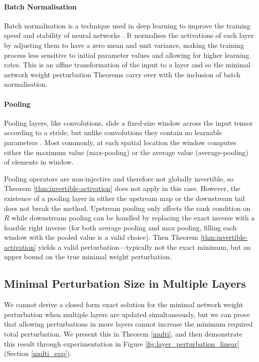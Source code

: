 \documentclass{article}
\theoremstyle{plain}
\theoremstyle{definition}
\theoremstyle{remark}
\begin{document}
\paragraph{Batch Normalisation}

Batch normalisation is a technique used in deep learning to improve the training speed and stability of neural networks \cite{ioffe_batch_2015}. It normalises the activations of each layer by adjusting them to have a zero mean and unit variance, making the training process less sensitive to initial parameter values and allowing for higher learning rates. This is an affine transformation of the input to a layer and so the minimal network weight perturbation Theorems carry over with the inclusion of batch normalisation.


\paragraph{Pooling}
Pooling layers, like convolutions, slide a fixed‐size window across the input tensor according to a stride, but unlike convolutions they contain no learnable parameters \cite{zhang_dive_2023}. Most commonly, at each spatial location the window computes either the maximum value (max‐pooling) or the average value (average‐pooling) of elements in window. 

Pooling operators are non-injective and therefore not globally invertible, so Theorem \ref{thm:invertible-activation} does not apply in this case. However, the existence of a pooling layer in either the upstream map or the downstream tail  does not break the method. Upstream pooling only affects the rank condition on $R$ while downstream pooling can be handled by replacing the exact inverse with a feasible right inverse (for both average pooling and max pooling, filling each window with the pooled value is a valid choice). Then Theorem \ref{thm:invertible-activation} yields a valid perturbation—typically not the exact minimum, but an upper bound on the true minimal weight perturbation.


\subsection{Minimal Perturbation Size in Multiple Layers}\label{multi_sec}
We cannot derive a closed form exact solution for the minimal network weight perturbation when multiple layers are updated simultaneously, but we can prove that allowing perturbations in more layers cannot increase the minimum required total perturbation. We present this in Theorem \ref{multi}, and then demonstrate this result through experimentation in Figure \ref{fig:layer_perturbation_linear} (Section \ref{multi_exp}).
\end{document}

